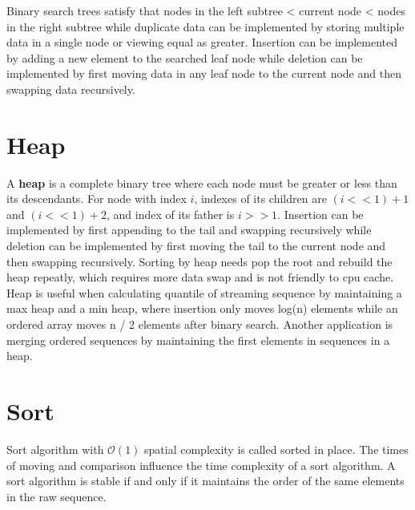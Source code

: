 \documentclass[a4paper,11pt]{article}
\begin{document}
Binary search trees satisfy that nodes in the left subtree < current node < nodes in the right subtree 
while duplicate data can be implemented by storing multiple data in a single node or viewing equal as greater.
Insertion can be implemented by adding a new element to the searched leaf node 
while deletion can be implemented by first moving data in any leaf node to the current node and then swapping data recursively.


\section*{Heap}
A \textbf{heap} is a complete binary tree where each node must be greater or less than its descendants.
For node with index $i$, indexes of its children are $(i << 1) + 1$ and $(i << 1) + 2$, and index of its father is $i >> 1$.
Insertion can be implemented by first appending to the tail and swapping recursively
while deletion can be implemented by first moving the tail to the current node and then swapping recursively.
Sorting by heap needs pop the root and rebuild the heap repeatly, which requires more data swap and is not friendly to cpu cache.
Heap is useful when calculating quantile of streaming sequence by maintaining a max heap and a min heap,
where insertion  only moves log(n) elements while an ordered array moves n / 2 elements after binary search.
Another application is merging ordered sequences by maintaining the first elements in sequences in a heap.


\section*{Sort}
Sort algorithm with $\mathcal{O}(1)$ spatial complexity is called sorted in place.
The times of moving and comparison influence the time complexity of a sort algorithm.
A sort algorithm is stable if and only if it maintains the order of the same elements in the raw sequence.
\end{document}
